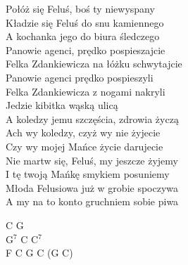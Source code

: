 \documentclass[a5paper, 10pt]{book}
\begin{document}
\begin{minipage}[t]{0.8\textwidth}
Połóż się Feluś, boś ty niewyspany\vspace*{1.8mm}\\
Kładzie się Feluś do snu kamiennego\\
A kochanka jego do biura śledczego\vspace*{1.8mm}\\
Panowie agenci, prędko pospieszajcie\\
Felka Zdankiewicza na łóżku schwytajcie\vspace*{1.8mm}\\
Panowie agenci prędko pospieszyli\\
Felka Zdankiewicza z nogami nakryli\vspace*{1.8mm}\\
Jedzie kibitka wąską ulicą\\
A koledzy jemu szczęścia, zdrowia życzą\vspace*{1.8mm}\\
Ach wy koledzy, czyż wy nie żyjecie\\
Czy wy mojej Mańce życie darujecie\vspace*{1.8mm}\\
Nie martw się, Feluś, my jeszcze żyjemy\\
I tę twoją Mańkę smykiem posuniemy\vspace*{1.8mm}\\
Młoda Felusiowa już w grobie spoczywa\\
A my na to konto gruchniem sobie piwa\vspace*{1.8mm}\\
\end{minipage}
\begin{minipage}[t]{0.4\textwidth}
C G\\
G$^7$ C C$^7$\vspace*{2.2mm}\\
F C G C (G C)\vspace*{2.2mm}\\

\end{minipage}

\newpage
\end{document}
